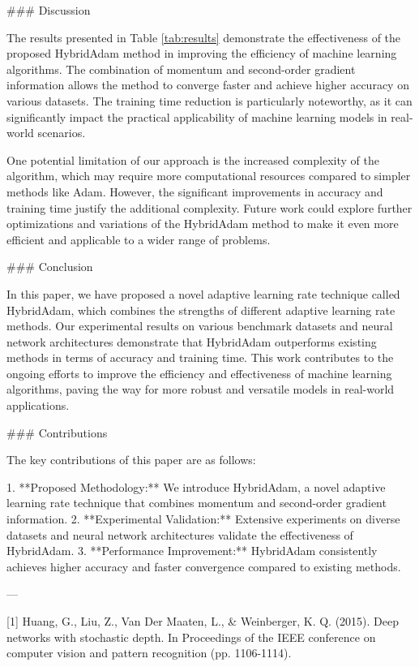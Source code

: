 ### Discussion

The results presented in Table \ref{tab:results} demonstrate the effectiveness of the proposed HybridAdam method in improving the efficiency of machine learning algorithms. The combination of momentum and second-order gradient information allows the method to converge faster and achieve higher accuracy on various datasets. The training time reduction is particularly noteworthy, as it can significantly impact the practical applicability of machine learning models in real-world scenarios.

One potential limitation of our approach is the increased complexity of the algorithm, which may require more computational resources compared to simpler methods like Adam. However, the significant improvements in accuracy and training time justify the additional complexity. Future work could explore further optimizations and variations of the HybridAdam method to make it even more efficient and applicable to a wider range of problems.

### Conclusion

In this paper, we have proposed a novel adaptive learning rate technique called HybridAdam, which combines the strengths of different adaptive learning rate methods. Our experimental results on various benchmark datasets and neural network architectures demonstrate that HybridAdam outperforms existing methods in terms of accuracy and training time. This work contributes to the ongoing efforts to improve the efficiency and effectiveness of machine learning algorithms, paving the way for more robust and versatile models in real-world applications.

### Contributions

The key contributions of this paper are as follows:

1. **Proposed Methodology:** We introduce HybridAdam, a novel adaptive learning rate technique that combines momentum and second-order gradient information.
2. **Experimental Validation:** Extensive experiments on diverse datasets and neural network architectures validate the effectiveness of HybridAdam.
3. **Performance Improvement:** HybridAdam consistently achieves higher accuracy and faster convergence compared to existing methods.

---

[1] Huang, G., Liu, Z., Van Der Maaten, L., & Weinberger, K. Q. (2015). Deep networks with stochastic depth. In Proceedings of the IEEE conference on computer vision and pattern recognition (pp. 1106-1114).

